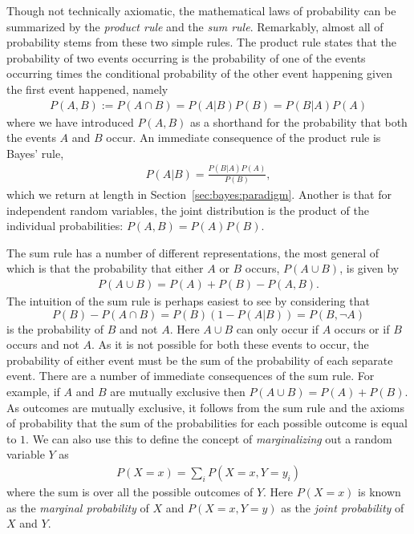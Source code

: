 Though not technically axiomatic, the mathematical laws of probability can be summarized by the \emph{product rule}
and the \emph{sum rule}.  Remarkably, almost all of probability stems from these two simple rules.
The product rule states that the probability of two events occurring is the probability of one of the events
occurring times the conditional probability of the other event happening given the first event happened, namely
\begin{align}
\label{eq:prob:prod}
P(A,B) := P(A \cap B) = P(A|B) P(B) =  P(B|A) P(A)
\end{align}
where we have introduced $P(A,B)$ as a shorthand for the probability that both the events $A$ and $B$ occur.
An immediate consequence of the product rule is Bayes' rule,
\begin{align}
P(A|B) = \frac{P(B|A)P(A)}{P(B)},
\end{align}
which we return at length in Section~\ref{sec:bayes:paradigm}.
Another is that for independent random variables, the joint distribution is the product of the
individual probabilities: $P(A,B)=P(A)P(B)$.

The sum rule has a number of different representations, the most general of which is that 
the probability that either $A$ or $B$ occurs, $P(A\cup B)$, is given by
\begin{align}
\label{eq:prob:sum}
P(A \cup B) = P(A) + P(B) - P(A, B).
\end{align}
The intuition of the sum rule is perhaps easiest to see by considering that
\[
P(B) - P(A \cap B) = P(B)(1-P(A|B)) = P(B, \neg A)
\]
 is the probability of $B$ and 
not $A$.  Here $A\cup B$ can only occur if $A$ occurs or if $B$ occurs and not $A$.  As it is not
possible for both these events to occur, the probability of either event must be the sum of the
probability of each separate event.
There are a number of immediate consequences of the sum rule.  For example, if $A$ and $B$ are
mutually exclusive then $P(A\cup B) = P(A) + P(B)$.  As outcomes are mutually exclusive, it
follows from the sum rule and the axioms of probability that the sum of the probabilities
for each possible outcome is equal to $1$.  We can also use this to
define the concept of \emph{marginalizing} out a random variable $Y$ as
\begin{align}
\label{eq:prob:marginal}
P(X=x) = \sum_{i} P(X=x,Y=y_i)
\end{align}
where the sum is over all the possible outcomes of $Y$.  Here $P(X=x)$ is known as the
\emph{marginal probability} of $X$ and $P(X=x,Y=y)$ as the \emph{joint probability} of $X$
and $Y$.


